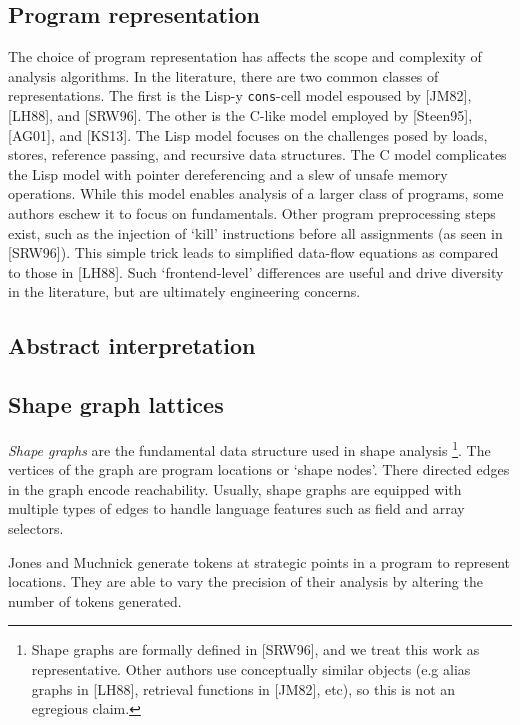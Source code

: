 \documentclass{article}
\begin{document}
\subsection{Program representation}

The choice of program representation has affects the scope and complexity of
analysis algorithms. In the literature, there are two common classes of
representations. The first is the Lisp-y \texttt{cons}-cell model espoused
by [JM82], [LH88], and [SRW96]. The other is the C-like model employed by
[Steen95], [AG01], and [KS13]. The Lisp model focuses on the challenges
posed by loads, stores, reference passing, and recursive data structures.
The C model complicates the Lisp model with pointer dereferencing and a slew
of unsafe memory operations. While this model enables analysis of a larger
class of programs, some authors eschew it to focus on fundamentals. Other
program preprocessing steps exist, such as the injection of `kill'
instructions before all assignments (as seen in [SRW96]). This simple trick
leads to simplified data-flow equations as compared to those in [LH88]. Such
`frontend-level' differences are useful and drive diversity in the
literature, but are ultimately engineering concerns.

\subsection{Abstract interpretation}

\subsection{Shape graph lattices}

\textit{Shape graphs} are the fundamental data structure used in shape
analysis 
    \footnote{Shape graphs are formally defined in [SRW96], and we treat
        this work as representative. Other authors use conceptually similar
        objects (e.g alias graphs in [LH88], retrieval functions in [JM82],
        etc), so this is not an egregious claim.}.
The vertices of the graph are program locations or `shape nodes'.  There
directed edges in the graph encode reachability. Usually, shape graphs are
equipped with multiple types of edges to handle language features such as
field and array selectors.

    Jones and Muchnick generate tokens at strategic points in a program to
    represent locations. They are able to vary the precision of their
    analysis by altering the number of tokens generated. 
\end{document}
